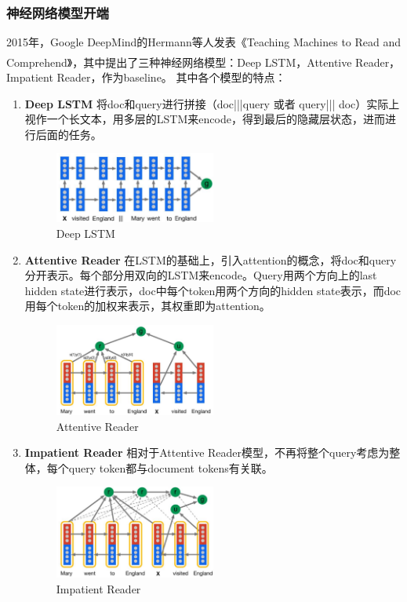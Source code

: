 \documentclass[10pt, a4]{extarticle}
\newcommand{\upcite}[1]{\textsuperscript{\textsuperscript{\cite{#1}}}}
\begin{document}
\subsubsection{神经网络模型开端}
2015年，Google DeepMind的Hermann等人发表《Teaching Machines to Read and Comprehend》\upcite{teaching}，其中提出了三种神经网络模型：Deep LSTM，Attentive Reader，Impatient Reader，作为baseline。
其中各个模型的特点：
\begin{enumerate}
	\item \textbf{Deep LSTM} 将doc和query进行拼接（doc|||query 或者 query||| doc）实际上视作一个长文本，用多层的LSTM来encode，得到最后的隐藏层状态，进而进行后面的任务。
	\begin{figure}[H]
		\centering
		\includegraphics[width=0.5\textwidth]{figure/lstm.png}
		\caption{Deep LSTM}
		\label{model_lstm}
	\end{figure}
	\item \textbf{Attentive Reader} 在LSTM的基础上，引入attention的概念，将doc和query分开表示。每个部分用双向的LSTM来encode。Query用两个方向上的last hidden state进行表示，doc中每个token用两个方向的hidden state表示，而doc用每个token的加权来表示，其权重即为attention。
	\begin{figure}[H]
		\centering
		\includegraphics[width=0.5\textwidth]{figure/attentive.png}
		\caption{Attentive Reader}
		\label{model_attentive}
	\end{figure}
	\item \textbf{Impatient Reader} 相对于Attentive Reader模型，不再将整个query考虑为整体，每个query token都与document tokens有关联。
	\begin{figure}[H]
		\centering
		\includegraphics[width=0.5\textwidth]{figure/impatient.png}
		\caption{Impatient Reader}
		\label{model_impatient}
	\end{figure}
\end{enumerate}
\end{document}
